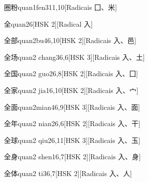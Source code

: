 \begin{entry}{圈粉}{quan1fen3}{11,10}[Radicais ⼞、⽶]
\end{entry}

\begin{entry}{全}{quan2}{6}[HSK 2][Radical ⼊]
\end{entry}

\begin{entry}{全部}{quan2bu4}{6,10}[HSK 2][Radicais ⼊、⾢]
\end{entry}

\begin{entry}{全场}{quan2 chang3}{6,6}[HSK 3][Radicais ⼊、⼟]
\end{entry}

\begin{entry}{全国}{quan2 guo2}{6,8}[HSK 2][Radicais ⼊、⼞]
\end{entry}

\begin{entry}{全家}{quan2 jia1}{6,10}[HSK 2][Radicais ⼊、⼧]
\end{entry}

\begin{entry}{全面}{quan2mian4}{6,9}[HSK 3][Radicais ⼊、⾯]
\end{entry}

\begin{entry}{全年}{quan2 nian2}{6,6}[HSK 2][Radicais ⼊、⼲]
\end{entry}

\begin{entry}{全球}{quan2 qiu2}{6,11}[HSK 3][Radicais ⼊、⽟]
\end{entry}

\begin{entry}{全身}{quan2 shen1}{6,7}[HSK 2][Radicais ⼊、⾝]
\end{entry}

\begin{entry}{全体}{quan2 ti3}{6,7}[HSK 2][Radicais ⼊、⼈]
\end{entry}

